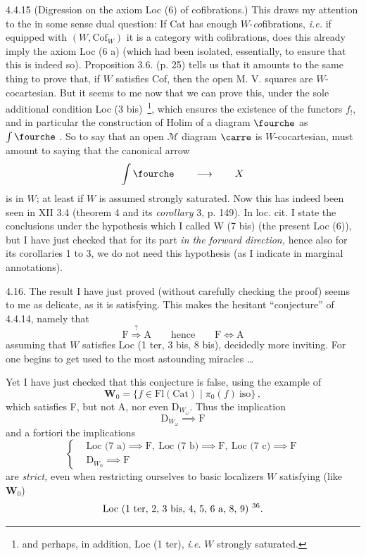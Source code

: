 4.4.15 (Digression on the axiom Loc (6) of cofibrations.) This draws my attention to the in some sense dual question: If Cat has enough $W$-\textit{co}fibrations, \textit{i.e.} if equipped with $(W,\mathrm{Cof}_W)$ it is a category with cofibrations, does this already imply the axiom Loc (6 a) (which had been isolated, essentially, to ensure that this is indeed so). Proposition 3.6. (p. 25) tells us that it amounts to the same thing to prove that, if $W$ satisfies Cof, then the open M. V. squares are
%
$W$-cocartesian. But it seems to me now that we can prove this, under the sole additional condition Loc (3 bis)~\footnote[35]{and perhaps, in addition, Loc (1 ter), \textit{i.e.} $W$ strongly saturated.}, which ensures the existence of the functors $f_!$, and %
%
in particular the construction of Holim of a diagram $\fourche$ \quad as $\int\fourche$ \quad .
So to say that an open $\mathcal{M}$ diagram $\carre$ is $W$-cocartesian, must amount to saying that the canonical arrow
\[
\int\fourche \qquad \longrightarrow \qquad X
\]
is in $W$; at least if $W$ is assumed strongly saturated. Now this has indeed been seen in XII 3.4 (theorem 4 and its \textit{corollary} 3, p. 149). In loc. cit. I state the conclusions under the hypothesis which I called W (7 bis) (the present Loc (6)), but I have just checked that for its part \textit{in the forward direction,} hence also for its corollaries 1 to 3, we do not need
%
this hypothesis (as I indicate in marginal annotations).

4.16. The result I have just proved (without carefully checking the proof) seems to me as delicate, as it is satisfying. This makes the hesitant ``conjecture'' of 4.4.14, namely that
\[
\mathrm{F} \overset{?}{\Longrightarrow} \mathrm{A} \qquad \text{hence} \qquad \mathrm{F}\Longleftrightarrow\mathrm{A}
\]
assuming that $W$ satisfies Loc (1 ter, 3 bis, 8 bis), decidedly more inviting. For one begins to get used to the most astounding miracles \ldots

Yet I have just checked that this conjecture is false, using the example of
\[
\mathbf{W}_0=\{f\in\mathrm{Fl}(\mathrm{Cat})\mid\pi_0(f)\ \mathrm{iso}\}\,,
\]
which satisfies F, but not A, nor even $\mathrm{D}_{W_\omega}$. Thus the implication
\[
\mathrm{D}_{W_\omega} \implies \mathrm{F}
\]
and a fortiori the implications
\[
\left\{
\begin{aligned}
&\text{Loc (7 a)} \implies \mathrm{F},\ \text{Loc (7 b)} \implies \mathrm{F},\ \text{Loc (7 c)} \implies \mathrm{F}\\
&\mathrm{D}_{W_0} \implies \mathrm{F}
\end{aligned}
\right.
\]
are \textit{strict,} even when restricting ourselves to basic localizers $W$ satisfying (like $\mathbf{W}_0$)
\[
\text{Loc (1 ter, 2, 3 bis, 4, 5, 6 a, 8, 9)}\ \text{\footnotemark[36]}.
\]
